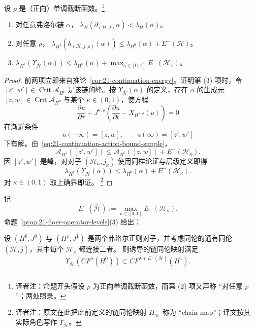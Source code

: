 \begin{proposition}
\label{prop:21-floer-operator-levels}
设 $\rho$ 是（正向）单调截断函数。\footnote{译者注：命题开头假设 $\rho$ 为正向单调截断函数，而第 (2) 项又声称
“对任意 $\rho$”；两处照录。}
\begin{enumerate}[label=(\arabic*)]
 \item 对任意弗洛尔链 $\alpha$，
 $\lambda_H(\partial_{(H,J)}\alpha)<\lambda_H(\alpha)$。
 \item 对任意 $\rho$，
 $\lambda_{H^1}(h_{(\mathcal H,j;\rho)}(\alpha))
 \leq\lambda_{H^0}(\alpha)+E^-(\mathcal H)$。
 \item $\lambda_{H^1}(\Upsilon_{\overline{\mathcal H}}(\alpha))
 \leq\lambda_{H^0}(\alpha)+\max_{\kappa\in[0,1]}E^-(\mathcal H_\kappa)$。
\end{enumerate}
\end{proposition}

\begin{proof}
前两项立即来自推论~\ref{cor:21-continuation-energy}。证明第 (3) 项时，令
$[z',w']\in\operatorname{Crit}\mathcal A_{H^1}$ 是该链的峰。按
$\Upsilon_{\overline{\mathcal H}}(\alpha)$ 的定义，存在 $\alpha$ 的生成元
$[z,w]\in\operatorname{Crit}\mathcal A_{H^0}$ 与某个 $\kappa\in(0,1)$，使方程
\begin{equation}
 \frac{\partial u}{\partial\tau}
 +J^{\kappa,\rho}\left(\frac{\partial u}{\partial t}-X_{H^{\kappa,\rho}}(u)\right)=0
 \label{eq:21-chain-homotopy-equation}
\end{equation}
在渐近条件
\[
 u(-\infty)=[z,w],\qquad u(\infty)=[z',w']
\]
下有解。由~\eqref{eq:21-continuation-action-bound-simple}，
\begin{equation}
 \mathcal A_{H^1}([z',w'])
 \leq\mathcal A_{H^0}([z,w])+E^-(\mathcal H_\kappa).
 \label{eq:21-chain-homotopy-action}
\end{equation}
因 $[z',w']$ 是峰，对对子 $(\mathcal H_\kappa,j_\kappa)$ 使用同样论证与层级定义即得
\[
 \lambda_{H^1}(\Upsilon_{\overline{\mathcal H}}(\alpha))
 \leq\lambda_{H^0}(\alpha)+E^-(\mathcal H_\kappa).
\]
对 $\kappa\in(0,1)$ 取上确界即证。
\footnote{译者注：原文在此把此前定义的链同伦映射
$H_{\overline{\mathcal H}}$ 称为 ``chain map''；译文按其实际角色写作
$\Upsilon_{\overline{\mathcal H}}$。}
\end{proof}

记
\[
 E^-(\overline{\mathcal H}):=
 \max_{\kappa\in[0,1]}E^-(\mathcal H_\kappa).
\]
命题~\ref{prop:21-floer-operator-levels}(3) 给出：

\begin{corollary}
\label{cor:21-chain-homotopy-filtration}
设 $(H^0,J^0)$ 与 $(H^1,J^1)$ 是两个弗洛尔正则对子，并考虑同伦的通有同伦
$(\overline{\mathcal H},\overline j)$，其中每个 $\mathcal H_\kappa$ 都连接二者。
则诱导的链同伦映射满足
\[
 \Upsilon_{\overline{\mathcal H}}(CF^\lambda(H^0))
 \subset CF^{\lambda+E^-(\overline{\mathcal H})}(H^1).
\]
\end{corollary}

